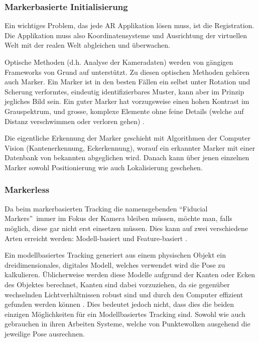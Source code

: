 \documentclass[a4paper]{scrreprt}
\begin{document}
\subsubsection{Markerbasierte Initialisierung}
Ein wichtiges Problem, das jede AR Applikation lösen muss, ist die Registration. Die Applikation muss also Koordinatensysteme und Ausrichtung der virtuellen Welt mit der realen Welt abgleichen und überwachen.

Optische Methoden (d.h. Analyse der Kameradaten) werden von gängigen Frameworks von Grund auf unterstützt. Zu diesen optischen Methoden gehören auch Marker. Ein Marker ist in den besten Fällen ein selbst unter Rotation und Scherung verformtes, eindeutig identifizierbares Muster, kann aber im Prinzip jegliches Bild sein. Ein guter Marker hat vorzugsweise einen hohen Kontrast im Grauspektrum, und grosse, komplexe Elemente ohne feine Details (welche auf Distanz verschwimmen oder verloren gehen) \parencite{Kudan2016}.

Die eigentliche Erkennung der Marker geschieht mit Algorithmen der Computer Vision (Kantenerkennung, Eckerkennung), worauf ein erkannter Marker mit einer Datenbank von bekannten abgeglichen wird. Danach kann über jenen einzelnen Marker sowohl Positionierung wie auch Lokalisierung geschehen.

\subsubsection{Markerless}
Da beim markerbasierten Tracking die namensgebenden \textquotedblleft Fiducial Markers\textquotedblright\ immer im Fokus der Kamera bleiben müssen, möchte man, falls möglich, diese gar nicht erst einsetzen müssen. Dies kann auf zwei verschiedene Arten erreicht werden: Modell-basiert und Feature-basiert \parencite{Ziegler2009}.

Ein modellbasiertes Tracking generiert aus einem physischen Objekt ein dreidimensionales, digitales Modell, welches verwendet wird die Pose zu kalkulieren. Üblicherweise werden diese Modelle aufgrund der Kanten oder Ecken des Objektes berechnet, Kanten sind dabei vorzuziehen, da sie gegenüber wechselnden Lichtverhältnissen robust sind und durch den Computer effizient gefunden werden können \parencite{Zhou2008}. Dies bedeutet jedoch nicht, dass dies die beiden einzigen Möglichkeiten für ein Modellbasiertes Tracking sind. Sowohl \citeauthor{PauloLima2017} wie auch \citeauthor{Cote2013} gebrauchen in ihren Arbeiten Systeme, welche von Punktewolken ausgehend die jeweilige Pose ausrechnen.
\end{document}
